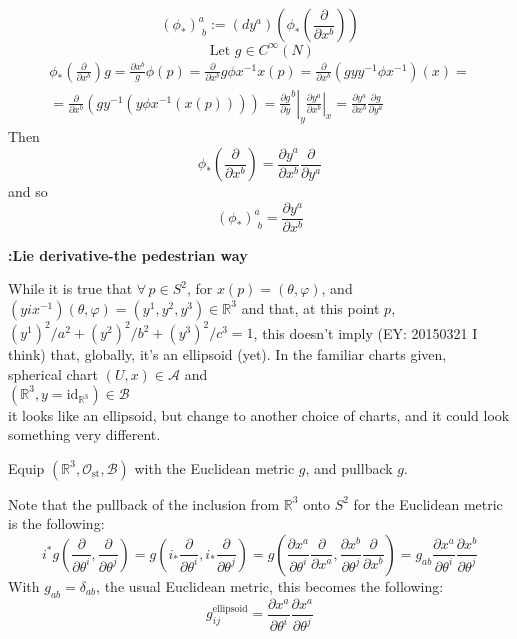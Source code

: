 \questionhead{}

\[
(\phi_*)^a_{ \, \, b} := (dy^a)(\phi_*( \frac{ \partial }{ \partial x^b } ) )
\]
\[
\text{ Let } g \in C^{\infty}(N)
\]
\[
\begin{gathered}
  \phi_* \left( \frac{ \partial }{ \partial x^b} \right) g = \frac{ \partial x^b} g\phi(p) = \frac{ \partial }{ \partial x^b} g\phi x^{-1}x(p) = \frac{ \partial }{ \partial x^b}(gyy^{-1}\phi x^{-1})(x) = \\
  = \frac{ \partial }{ \partial x^b}(gy^{-1}(y\phi x^{-1}(x(p))) ) = \left. \frac{ \partial g}{ \partial y}^b \right|_y \left. \frac{ \partial y^a}{ \partial x^b} \right|_x = \frac{ \partial y^a}{ \partial x^b} \frac{ \partial g}{ \partial y^a}
\end{gathered}
\]
Then 
\[
\phi_*\left( \frac{ \partial }{ \partial x^b} \right) = \frac{ \partial y^a}{ \partial x^b} \frac{ \partial }{ \partial y^a}
\]
and so 
\[
(\phi_*)^a_{ \, \, b} = \frac{ \partial y^a}{ \partial x^b}
\]

\questionhead{}

\textbf{:Lie derivative-the pedestrian way}

\questionhead{} While it is true that $\forall \, p \in S^2$, for $x(p) = (\theta, \varphi)$, and $(yix^{-1})(\theta,\varphi) = (y^1,y^2,y^3) \in \mathbb{R}^3$ and that, at this point $p$, $(y^1)^2/a^2 + (y^2)^2/b^2 +(y^3)^2/c^3 = 1$, this doesn't imply (EY: 20150321 I think) that, globally, it's an ellipsoid (yet).  In the familiar charts given, \\
spherical chart $(U,x) \in \mathcal{A}$ and \\
$(\mathbb{R}^3, y=\text{id}_{\mathbb{R}^3}) \in \mathcal{B}$ \\
it looks like an ellipsoid, but change to another choice of charts, and it could look something very different.  

\questionhead{}

Equip $(\mathbb{R}^3, \mathcal{O}_{\text{st}}, \mathcal{B})$ with the Euclidean metric $g$, and pullback $g$.  

Note that the pullback of the inclusion from $\mathbb{R}^3$ onto $S^2$ for the Euclidean metric is the following:
\[
i^* g\left( \frac{ \partial }{ \partial \theta^i }, \frac{ \partial }{ \partial \theta^j} \right) = g\left( i_*\frac{ \partial }{ \partial \theta^i }, i_*\frac{ \partial }{ \partial \theta^j} \right) = g\left( \frac{ \partial x^a}{ \partial \theta^i} \frac{ \partial }{ \partial x^a} , \frac{ \partial x^b}{ \partial \theta^j} \frac{ \partial }{ \partial x^b } \right) = g_{ab} \frac{ \partial x^a}{ \partial \theta^i} \frac{ \partial x^b}{ \partial \theta^j} 
\]
With $g_{ab}=\delta_{ab}$, the usual Euclidean metric, this becomes the following:
\[
g^{\text{ellipsoid}}_{ij} = \frac{ \partial x^a}{ \partial \theta^i} \frac{ \partial x^a}{ \partial \theta^j} 
\]

